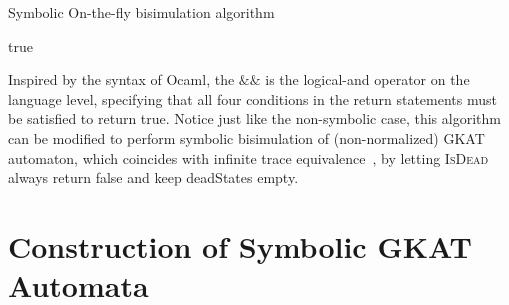 \documentclass[conference]{IEEEtran}
\begin{document}
\begin{algorithm*}
    \caption{Symbolic On-the-fly bisimulation algorithm}\label{alg:symb-bisim}
    \begin{algorithmic}
         {\Return true}
         {\Return {}} 
         {\Return {}} 
        \Else {}
        \EndIf
        \EndFunction
    \end{algorithmic}
\end{algorithm*}

Inspired by the syntax of Ocaml, the \(\mathrel{\&\!\&}\) is the logical-and operator on the language level, specifying that all four conditions in the return statements must be satisfied to return true. 
Notice just like the non-symbolic case, this algorithm can be modified to perform symbolic bisimulation of (non-normalized) GKAT automaton, which coincides with infinite trace equivalence~\cite{schmid_GuardedKleeneAlgebra_2021}, by letting \textsc{IsDead} always return false and keep deadStates empty.


\section{Construction of Symbolic GKAT Automata}
\end{document}
